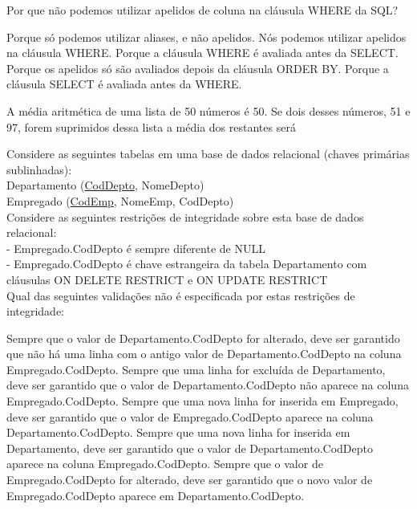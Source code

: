 \documentclass[12pt, addpoints]{exam}
\begin{document}
\begin{questions}
\question

Por que não podemos utilizar apelidos de coluna na cláusula WHERE da SQL?
\begin{choices}
\choice Porque só podemos utilizar aliases, e não apelidos.
\choice Nós podemos utilizar apelidos na cláusula WHERE.
\choice Porque a cláusula WHERE é avaliada antes da SELECT.
\choice Porque os apelidos só são avaliados depois da cláusula ORDER BY.
\choice Porque a cláusula SELECT é avaliada antes da WHERE.
\end{choices}

\question

A média aritmética de uma lista de 50 números é 50. Se dois desses números, 51 e 97, forem suprimidos dessa lista a média dos restantes será


\begin{choices}
\end{choices}

\question

Considere as seguintes tabelas em uma base de dados relacional (chaves primárias sublinhadas):\\

Departamento (\underline{CodDepto}, NomeDepto)\\

Empregado (\underline{CodEmp}, NomeEmp, CodDepto)\\

Considere as seguintes restrições de integridade sobre esta base de dados relacional:\\

- Empregado.CodDepto é sempre diferente de NULL\\

- Empregado.CodDepto é chave estrangeira da tabela Departamento com cláusulas ON DELETE RESTRICT e ON UPDATE RESTRICT\\

Qual das seguintes validações não é especificada por estas restrições de integridade:
\begin{choices}
\choice Sempre que o valor de Departamento.CodDepto for alterado, deve ser garantido que não há uma linha com o antigo valor de Departamento.CodDepto na coluna Empregado.CodDepto.
\choice Sempre que uma linha for excluída de Departamento, deve ser garantido que o valor de Departamento.CodDepto não aparece na coluna Empregado.CodDepto.
\choice Sempre que uma nova linha for inserida em Empregado, deve ser garantido que o valor de Empregado.CodDepto aparece na coluna Departamento.CodDepto.
\choice Sempre que uma nova linha for inserida em Departamento, deve ser garantido que o valor de Departamento.CodDepto aparece na coluna Empregado.CodDepto.
\choice Sempre que o valor de Empregado.CodDepto for alterado, deve ser garantido que o novo valor de Empregado.CodDepto aparece em Departamento.CodDepto.
\end{choices}


\end{questions}
\end{document}
